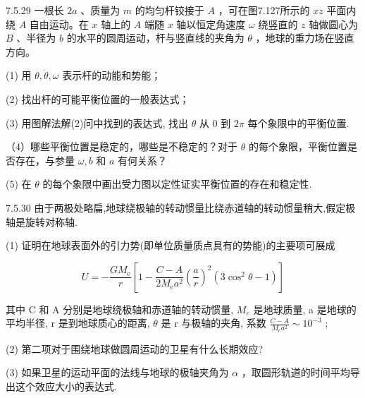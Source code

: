 \begin{problem}{7.5.29}
一根长 $2a$ 、质量为 $m$ 的均匀杆铰接于 $A$ ，可在图7.127所示的 $xz$ 平面内绕 $A$ 自由运动。在 $x$ 轴上的 $A$ 端随 $x$ 轴以恒定角速度 $\omega$ 绕竖直的 $z$ 轴做圆心为 $B$ 、半径为 $b$ 的水平的圆周运动，杆与竖直线的夹角为 $\theta$ ，地球的重力场在竖直方向。

(1) 用 $\theta, \dot{\theta}, \omega$ 表示杆的动能和势能；

(2) 找出杆的可能平衡位置的一般表达式；

(3) 用图解法解(2)问中找到的表达式, 找出 $\theta$ 从 0 到 $2\pi$ 每个象限中的平衡位置.

（4）哪些平衡位置是稳定的，哪些是不稳定的？对于 $\theta$ 的每个象限，平衡位置是否存在，与参量 $\omega, b$ 和 $a$ 有何关系？

(5) 在 $\theta$ 的每个象限中画出受力图以定性证实平衡位置的存在和稳定性.
\begin{center}

\end{center}
\end{problem}
\clearpage


\begin{problem}{7.5.30}
由于两极处略扁,地球绕极轴的转动惯量比绕赤道轴的转动惯量稍大,假定极轴是旋转对称轴.

(1) 证明在地球表面外的引力势(即单位质量质点具有的势能)的主要项可展成

\[
U = - \frac {G M _ {\mathrm{e}}}{r} \left[ 1 - \frac {C - A}{2 M _ {\mathrm{e}} a ^ {2}} \left(\frac {a}{r}\right) ^ {2} (3 \cos^ {2} \theta - 1) \right]
\]

其中 C 和 A 分别是地球绕极轴和赤道轴的转动惯量, $M_{e}$ 是地球质量, a 是地球的平均半径, r 是到地球质心的距离, $\theta$ 是 r 与极轴的夹角, 系数 $\frac{C-A}{M_{e}a^{2}} \sim 10^{-3}$ ;

(2) 第二项对于围绕地球做圆周运动的卫星有什么长期效应?

(3) 如果卫星的运动平面的法线与地球的极轴夹角为 $\alpha$ ，取圆形轨道的时间平均导出这个效应大小的表达式.
\end{problem}
\clearpage


